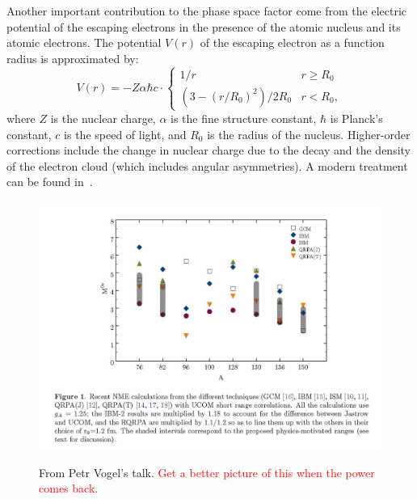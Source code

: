 Another important contribution to the phase space factor come from the electric potential of the escaping electrons in the presence of the atomic nucleus and its atomic electrons.  The potential $V(r)$ of the escaping electron as a function radius is approximated by:~\cite{PhysRevC.87.014315}
\begin{equation}
V(r) = -Z \alpha \hbar c \cdot \begin{cases}
1/r & r \ge R_0 \\
\left(3-(r/R_0)^2\right)/2R_0 & r < R_0,
\end{cases}
\end{equation}
where $Z$ is the nuclear charge, $\alpha$ is the fine structure constant, $\hbar$ is Planck's constant, $c$ is the speed of light, and $R_0$ is the radius of the nucleus.  Higher-order corrections include the change in nuclear charge due to the decay and the density of the electron cloud (which includes angular asymmetries).  A modern treatment can be found in~\cite{PhysRevC.87.014315}.

\begin{figure}
\begin{center}
\includegraphics[keepaspectratio=true,width=\textwidth]{MatrixElementComparisonByElement.jpg}
\end{center}
\renewcommand{\baselinestretch}{1}
\small\normalsize
\begin{quote}
\caption{From Petr Vogel's talk.  \textcolor{red}{Get a better picture of this when the power comes back.}}
\label{fig:MatrixElementComparisonVsAtom}
\end{quote}
\end{figure}
\renewcommand{\baselinestretch}{2}
\small\normalsize

